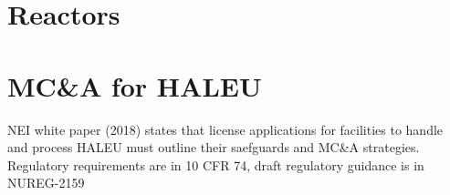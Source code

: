 \documentclass{article}
\begin{document}
\section{Reactors}

\section{MC\&A for HALEU}
NEI white paper (2018) states that license applications for facilities
to handle and process HALEU must outline their saefguards and MC\&A 
strategies. Regulatory requirements are in 10 CFR 74, draft regulatory 
guidance is in NUREG-2159



\end{document}
